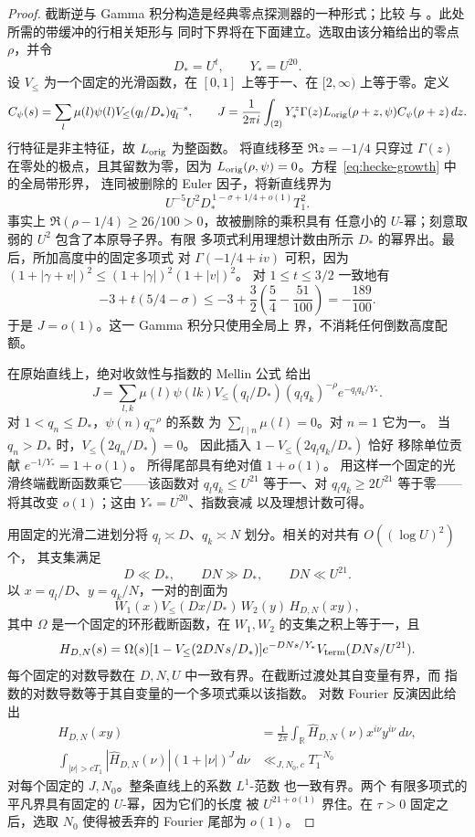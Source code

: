 \documentclass[11pt,a4paper]{article}
\numberwithin{equation}{section}
\numberwithin{figure}{section}
\theoremstyle{definition}
\theoremstyle{remark}
\begin{document}
\begin{proof}
截断逆与 Gamma 积分构造是经典零点探测器的一种形式；比较 \cite[附录 C]{MP}
与 \cite[第~13.1 节]{GM}。此处所需的带缓冲的行相关矩形与
同时下界将在下面建立。选取由该分箱给出的零点 \(\rho\)，并令
\[
 D_*=U^t,\qquad Y_*=U^{20}.
\]
设 \(V_{\le}\) 为一个固定的光滑函数，在
\([0,1]\) 上等于一、在 \([2,\infty)\) 上等于零。定义
\[
 C_\psi(s)=\sum_l\mu(l)\psi(l)V_{\le}(q_l/D_*)q_l^{-s},
 \qquad
 J=\frac1{2\pi i}\int_{(2)}
       Y_*^z\Gamma(z)L_{\rm orig}(\rho+z,\psi)
       C_\psi(\rho+z)\,dz.
\]
行特征是非主特征，故 \(L_{\rm orig}\) 为整函数。
将直线移至 \(\Re z=-1/4\) 只穿过
\(\Gamma(z)\) 在零处的极点，且其留数为零，因为
\(L_{\rm orig}(\rho,\psi)=0\)。方程~\eqref{eq:hecke-growth} 中的全局带形界，
连同被删除的 Euler 因子，将新直线界为
\[
 U^{-5}U^2D_*^{\,1-\sigma+1/4+o(1)}T_1^2.
\]
事实上 \(\Re(\rho-1/4)\ge26/100>0\)，故被删除的乘积具有
任意小的 \(U\)-幂；刻意取弱的
\(U^2\) 包含了本原导子界。有限
多项式利用理想计数由所示 \(D_*\) 的幂界出。最后，所加高度中的固定多项式
对 \(\Gamma(-1/4+iv)\) 可积，因为
\((1+|\gamma+v|)^2\le(1+|\gamma|)^2(1+|v|)^2\)。
对 \(1\le t\le3/2\) 一致地有
\[
 -3+t(5/4-\sigma)
 \le-3+\frac32\left(\frac54-\frac{51}{100}\right)
 =-\frac{189}{100}.
\]
于是 \(J=o(1)\)。这一 Gamma 积分只使用全局上
界，不消耗任何倒数高度配额。

在原始直线上，绝对收敛性与指数的 Mellin 公式
给出
\[
 J=\sum_{l,k}\mu(l)\psi(lk)V_{\le}(q_l/D_*)
       (q_lq_k)^{-\rho}e^{-q_lq_k/Y_*}.
\]
对 \(1<q_n\le D_*\)，\(\psi(n)q_n^{-\rho}\) 的系数
为 \(\sum_{l\mid n}\mu(l)=0\)。对 \(n=1\) 它为一。
当 \(q_n>D_*\) 时，\(V_{\le}(2q_n/D_*)=0\)。
因此插入 \(1-V_{\le}(2q_lq_k/D_*)\) 恰好
移除单位贡献 \(e^{-1/Y_*}=1+o(1)\)。
所得尾部具有绝对值 \(1+o(1)\)。
用这样一个固定的光滑终端截断函数乘它——该函数对
\(q_lq_k\le U^{21}\) 等于一、对 \(q_lq_k\ge2U^{21}\) 等于零——将其改变
\(o(1)\)；这由 \(Y_*=U^{20}\)、指数衰减
以及理想计数可得。

用固定的光滑二进划分将 \(q_l\asymp D\)、\(q_k\asymp N\)
划分。相关的对共有 \(O((\log U)^2)\) 个，
其支集满足
\[
 D\ll D_*,\qquad DN\gg D_*,\qquad DN\ll U^{21}.
\]
以 \(x=q_l/D\)、\(y=q_k/N\)，一对的剖面为
\[
 W_1(x)V_{\le}(Dx/D_*)\,W_2(y)\,H_{D,N}(xy),
\]
其中 \(\Omega\) 是一个固定的环形截断函数，在
\(W_1,W_2\) 的支集之积上等于一，且
\[
 H_{D,N}(s)=\Omega(s)
   [1-V_{\le}(2DNs/D_*)]e^{-DNs/Y_*}
   V_{\rm term}(DNs/U^{21}).
\]
每个固定的对数导数在
\(D,N,U\) 中一致有界。在截断过渡处其自变量有界，而
指数的对数导数等于其自变量的一个多项式乘以该指数。
对数 Fourier 反演因此给出
\[
 \begin{split}
 H_{D,N}(xy)&=\frac1{2\pi}\int_{\mathbb R}
      \widehat H_{D,N}(\nu)x^{i\nu}y^{i\nu}\,d\nu,\\
 \int_{|\nu|>cT_1}|\widehat H_{D,N}(\nu)|
       (1+|\nu|)^J\,d\nu&\ll_{J,N_0,c}T_1^{-N_0}
 \end{split}
\]
对每个固定的 \(J,N_0\)。整条直线上的系数 \(L^1\)-范数
也一致有界。两个
有限多项式的平凡界具有固定的 \(U\)-幂，因为它们的长度
被 \(U^{21+o(1)}\) 界住。在 \(\tau>0\) 固定之后，选取
\(N_0\) 使得被丢弃的 Fourier 尾部为 \(o(1)\)。


\end{proof}
\end{document}
